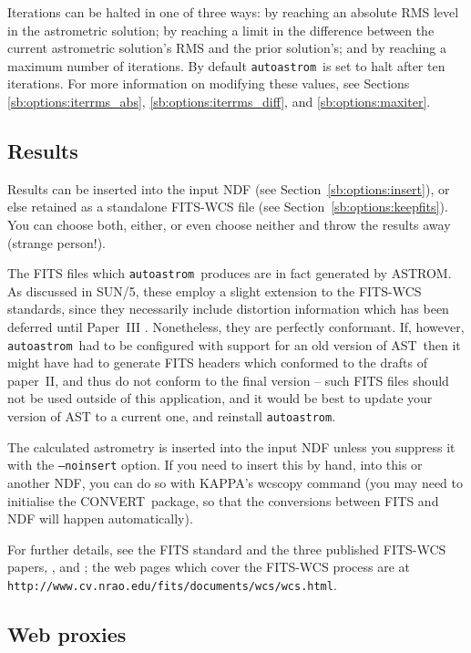 \documentclass[twoside,11pt]{article}
\newcommand{\xref}[3]{#1}
\newcommand{\xlabel}[1]{}
\newcommand{\AST}{\xref{{\footnotesize AST}}{sun210}{}}
\newcommand{\ASTROM}{{\footnotesize ASTROM}\normalsize}
\newcommand{\autoastrom}{\texttt{autoastrom}}
\newcommand{\CONVERT}{{\footnotesize CONVERT}\normalsize}
\newcommand{\KAPPA}{{\footnotesize KAPPA}\normalsize}
\begin{document}
Iterations can be halted in one of three ways: by reaching an absolute RMS
level in the astrometric solution; by reaching a limit in the difference
between the current astrometric solution's RMS and the prior solution's; and
by reaching a maximum number of iterations. By default \autoastrom\ is set to
halt after ten iterations. For more information on modifying these values, see
Sections \ref{sb:options:iterrms_abs}, \ref{sb:options:iterrms_diff}, and
\ref{sb:options:maxiter}.

\subsection{\xlabel{sb_results}Results\label{sb:results}}

Results can be inserted into the input NDF (see
Section~\ref{sb:options:insert}), or else retained as a standalone FITS-WCS
file (see Section~\ref{sb:options:keepfits}).  You can choose both, either, or
even choose neither and throw the results away (strange person!).

The FITS files which \autoastrom\ produces are in fact generated by \ASTROM.
As discussed in SUN/5, these employ a slight extension to the FITS-WCS
standards, since they necessarily include distortion information which has
been deferred until Paper~III \cite{fitswcs3}.  Nonetheless, they are
perfectly conformant.  If, however, \autoastrom\ had to be configured with
support for an old version of \AST\, then it might have had to generate FITS
headers which conformed to the drafts of paper~II, and thus do not conform to
the final version -- such FITS files should not be used outside of this
application, and it would be best to update your version of AST to a current
one, and reinstall \autoastrom.

The calculated astrometry is inserted into the input NDF unless you suppress
it with the \texttt{--noinsert} option.  If you need to insert this by hand,
into this or another NDF, you can do so with \KAPPA's wcscopy command (you may
need to initialise the \CONVERT\ package, so that the conversions between FITS
and NDF will happen automatically).

For further details, see the FITS standard \cite{nost-100-2} and the three
published FITS-WCS papers, \cite[FITS WCS Paper I]{fitswcs1}, \cite[FITS WCS
Paper II]{fitswcs2} and \cite[FITS WCS Paper III]{fitswcs3}; the web pages
which cover the FITS-WCS process are at
\texttt{http://www.cv.nrao.edu/fits/documents/wcs/wcs.html}.

\subsection{\xlabel{sb_webproxies}Web proxies\label{sb:webproxies}}
\end{document}
